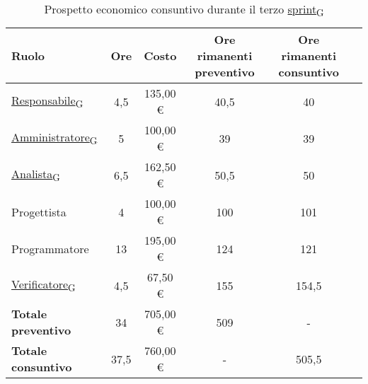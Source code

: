 \begin{table}[!h]
	\centering
	\begin{tabular}{ | l | c | c | c | c | c | }
		\hline
		\textbf{Ruolo}             & \textbf{Ore} & \textbf{Costo} & \textbf{Ore rimanenti preventivo} & \textbf{Ore rimanenti consuntivo} \\
		\hline
		\href{https://7last.github.io/docs/rtb/documentazione-interna/glossario\#responsabile}{Responsabile\textsubscript{G}}               & 4,5          & 135,00 €       & 40,5                              & 40                                \\
		\href{https://7last.github.io/docs/rtb/documentazione-interna/glossario\#amministratore}{Amministratore\textsubscript{G}}             & 5            & 100,00 €       & 39                                & 39                                \\
		\href{https://7last.github.io/docs/rtb/documentazione-interna/glossario\#analista}{Analista\textsubscript{G}}                   & 6,5          & 162,50 €       & 50,5                              & 50                                \\
		Progettista                & 4            & 100,00 €       & 100                               & 101                               \\
		Programmatore              & 13           & 195,00 €       & 124                               & 121                               \\
		\href{https://7last.github.io/docs/rtb/documentazione-interna/glossario\#verificatore}{Verificatore\textsubscript{G}}               & 4,5          & 67,50 €        & 155                               & 154,5                             \\
		\hline
		\textbf{Totale preventivo} & 34           & 705,00 €       & 509                               & -                                 \\
		\hline
		\textbf{Totale consuntivo} & 37,5         & 760,00 €       & -                                 & 505,5                             \\
		\hline
	\end{tabular}
	\caption{Prospetto economico consuntivo durante il terzo \href{https://7last.github.io/docs/rtb/documentazione-interna/glossario\#sprint}{sprint\textsubscript{G}}}
	
\end{table}


